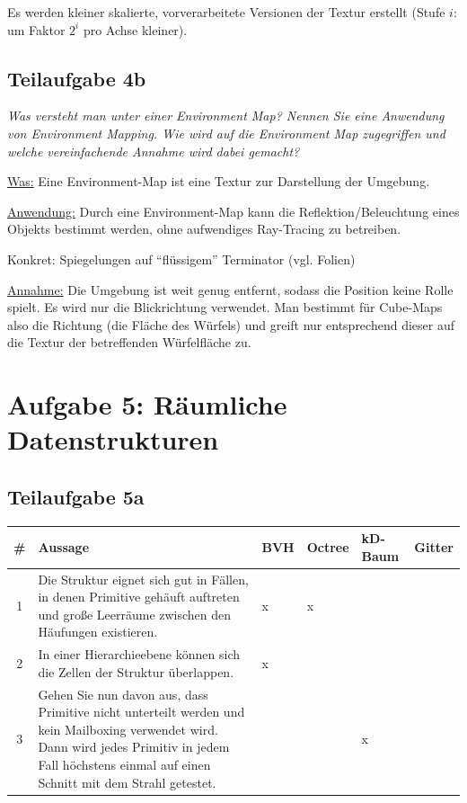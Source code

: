 \documentclass[a4paper]{scrartcl}
\begin{document}
Es werden kleiner skalierte, vorverarbeitete Versionen der Textur erstellt
(Stufe $i$: um Faktor $2^i$ pro Achse kleiner).

\subsection*{Teilaufgabe 4b}
\textit{Was versteht man unter einer Environment Map? Nennen Sie eine Anwendung
von Environment Mapping. Wie wird auf die Environment Map zugegriffen und
welche vereinfachende Annahme wird dabei gemacht?}

\underline{Was:} Eine Environment-Map ist eine Textur zur Darstellung der Umgebung.

\underline{Anwendung:} Durch eine Environment-Map kann die
Reflektion/Beleuchtung eines Objekts bestimmt werden, ohne aufwendiges
Ray-Tracing zu betreiben.

Konkret: Spiegelungen auf \enquote{flüssigem} Terminator (vgl. Folien)

\underline{Annahme:} Die Umgebung ist weit genug entfernt, sodass die Position
keine Rolle spielt. Es wird nur die Blickrichtung verwendet. Man bestimmt für
Cube-Maps also die Richtung (die Fläche des Würfels) und greift nur
entsprechend dieser auf die Textur der betreffenden Würfelfläche zu.

\section*{Aufgabe 5: Räumliche Datenstrukturen}
\subsection*{Teilaufgabe 5a}
\begin{tabular}{cp{8cm}llll}\toprule
\#& Aussage                                                                                                                                                                                                & BVH     & Octree & kD-Baum & Gitter \\\midrule
1 & Die Struktur eignet sich gut in Fällen, in denen Primitive gehäuft auftreten und große Leerräume zwischen den Häufungen existieren.                                                                    & x       & x      & ~       & ~      \\
2 & In einer Hierarchieebene können sich die Zellen der Struktur überlappen.                                                                                                                               & x       & ~      & ~       & ~      \\
3 & Gehen Sie nun davon aus, dass Primitive nicht unterteilt werden und kein Mailboxing verwendet wird. Dann wird jedes Primitiv in jedem Fall höchstens einmal auf einen Schnitt mit dem Strahl getestet. & ~       & ~      & x       & ~      \\\bottomrule
\end{tabular}
\end{document}
